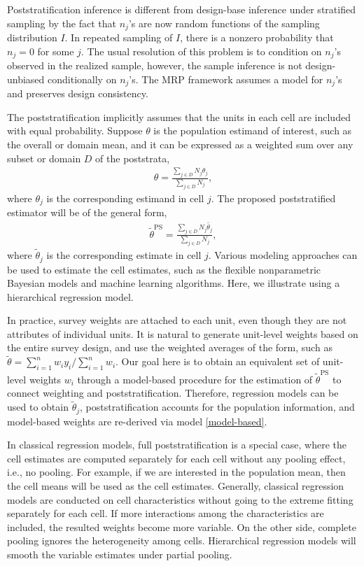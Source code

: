 \documentclass[11pt]{article}
\numberwithin{figure}{section}
\numberwithin{table}{section}
\numberwithin{equation}{section}
\begin{document}
Poststratification inference is different from design-base inference under
stratified sampling by the fact that $n_j$'s are now random functions of the
sampling distribution $I$. In repeated sampling of $I$, there is a nonzero
probability that $n_j=0$ for some $j$. The usual resolution of this problem is
to condition on $n_j$'s observed in the realized sample, however, the sample
inference is not design-unbiased conditionally on $n_j$'s. The MRP framework
assumes a model for $n_j$'s and preserves design consistency.
	
The poststratification implicitly assumes that the units in each cell are
included with equal probability. Suppose $\theta$ is the population estimand of
interest, such as the overall or domain mean, and it can be expressed as a
weighted sum over any subset or domain $D$ of the poststrata, \begin{align}
\theta=\frac{\sum_{j\in D}N_j\theta_j}{\sum_{j\in D}N_j}, \end{align} where
$\theta_j$ is the corresponding estimand in cell $j$.  The proposed
poststratified estimator will be of the general form, \begin{align}
\label{model-based} \tilde{\theta}^{\textrm{PS}}=\frac{\sum_{j\in
D}N_j\tilde{\theta_j}}{\sum_{j\in D}N_j}, \end{align} where $\tilde{\theta}_j$
is the corresponding estimate in cell $j$. Various modeling approaches can be
used to estimate the cell estimates, such as the flexible nonparametric
Bayesian models and machine learning algorithms. Here, we illustrate using a
hierarchical regression model.

In practice, survey weights are attached to each unit, even though they are not
attributes of individual units. It is natural to generate unit-level weights
based on the entire survey design, and use the weighted averages of the form,
such as $\tilde{\theta}=\sum_{i=1}^n w_i y_i/\sum_{i=1}^nw_i$. Our goal here is
to obtain an equivalent set of unit-level weights $w_i$ through a model-based
procedure for the estimation of $\tilde{\theta}^{\textrm{PS}}$ to connect
weighting and poststratification. Therefore, regression models can be used to
obtain $\tilde{\theta}_j$, poststratification accounts for the population
information, and model-based weights are re-derived via model
\eqref{model-based}.
	
In classical regression models, full poststratification is a special case,
where the cell estimates are computed separately for each cell without any
pooling effect, i.e., no pooling. For example, if we are interested in the
population mean, then the cell means will be used as the cell estimates.
Generally, classical regression models are conducted on cell characteristics
without going to the extreme fitting separately for each cell. If more
interactions among the characteristics are included, the resulted weights
become more variable. On the other side, complete pooling ignores the
heterogeneity among cells. Hierarchical regression models will smooth the
variable estimates under partial pooling. 
	
\end{document}
